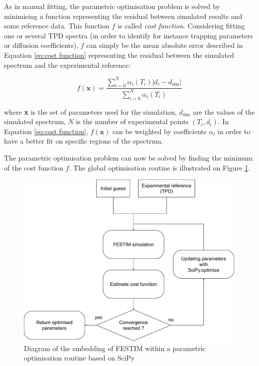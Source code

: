 As in manual fitting, the parametric optimisation problem is solved by minimising a function representing the residual between simulated results and some reference data.
This function $f$ is called \textit{cost function}.
Considering fitting one or several TPD spectra (in order to identify for instance trapping parameters or diffusion coefficients), $f$ can simply be the mean absolute error described in Equation \ref{eq:cost function} representing the residual between the simulated spectrum and the experimental reference: 

\begin{equation}
    f(\textbf{x})=\frac{\sum_{i=0}^{N}  \alpha_i(T_i)\left| d_{i}-d_{\mathrm{sim}}\right|}{\sum_{i=0}^{N}  \alpha_i(T_i)}
    \label{eq:cost function}
\end{equation}

where \textbf{x} is the set of parameters used for the simulation, $d_\mathrm{sim}$ are the values of the simulated spectrum, $N$ is the number of experimental points $(T_i, d_i)$.
In Equation \ref{eq:cost function}, $f(\textbf{x})$ can be weighted by coefficients $\alpha_i$ in order to have a better fit on specific regions of the spectrum.

The parametric optimisation problem can now be solved by finding the minimum of the cost function $f$.
The global optimisation routine is illustrated on Figure \ref{fig:diagramm}.
\begin{figure}
    \centering
    \includegraphics[width=\linewidth]{Figures/Chapter3/Parametric_optimisation/algorithm diagram.pdf}
    \caption{Diagram of the embedding of FESTIM within a parametric optimisation routine based on SciPy \cite{virtanen_scipy_2020}}
    \label{fig:diagramm}
\end{figure}


